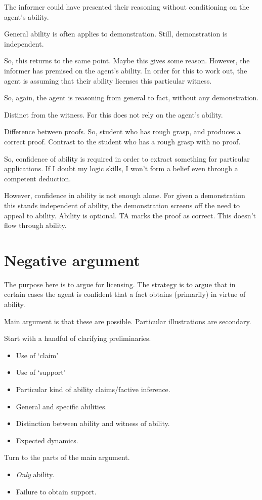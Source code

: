 \documentclass[10pt]{article}
\begin{document}
The informer could have presented their reasoning without conditioning on the agent's ability.

General ability is often applies to demonstration.
Still, demonstration is independent.

So, this returns to the same point.
Maybe this gives some reason.
However, the informer has premised on the agent's ability.
In order for this to work out, the agent is assuming that their ability licenses this particular witness.

So, again, the agent is reasoning from general to fact, without any demonstration.


Distinct from the witness.
For this does not rely on the agent's ability.

Difference between proofs.
So, student who has rough grasp, and produces a correct proof.
Contrast to the student who has a rough grasp with no proof.

So, confidence of ability is required in order to extract something for particular applications.
If I doubt my logic skills, I won't form a belief even through a competent deduction.

However, confidence in ability is not enough alone.
For given a demonstration this stands independent of ability, the demonstration screens off the need to appeal to ability.
Ability is optional.
TA marks the proof as correct.
This doesn't flow through ability.




\newpage

\section{Negative argument}
\label{sec:negative-argument}

\begin{note}[Goal]
  The purpose here is to argue for licensing.
  The strategy is to argue that in certain cases the agent is confident that a fact obtains (primarily) in virtue of ability.

  Main argument is that these are possible.
  Particular illustrations are secondary.

  Start with a handful of clarifying preliminaries.
  \begin{itemize}
  \item Use of `claim'
  \item Use of `support'
  \item Particular kind of ability claims/factive inference.
  \item General and specific abilities.
  \item Distinction between ability and witness of ability.
  \item Expected dynamics.
  \end{itemize}
  Turn to the parts of the main argument.
  \begin{itemize}
  \item \emph{Only} ability.
  \item Failure to obtain support.
  \end{itemize}
\end{note}
\end{document}
